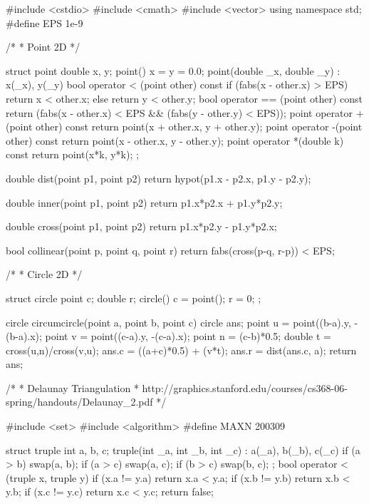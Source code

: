 \documentclass[11pt]{article}
\begin{document}
\begingroup\scriptsize
\begin{vncode}
#include <cstdio>
#include <cmath>
#include <vector>
using namespace std;
#define EPS 1e-9

/*
 * Point 2D
 */

struct point {
	double x, y;
	point() { x = y = 0.0; }
	point(double _x, double _y) : x(_x), y(_y) {}
	bool operator < (point other) const {
		if (fabs(x - other.x) > EPS) return x < other.x;
		else return y < other.y;
	}
	bool operator == (point other) const {
		return (fabs(x - other.x) < EPS && (fabs(y - other.y) < EPS));
	}
	point operator +(point other) const {
		return point(x + other.x, y + other.y);
	}
	point operator -(point other) const {
		return point(x - other.x, y - other.y);
	}
	point operator *(double k) const {
		return point(x*k, y*k);
	}
};

double dist(point p1, point p2) {
	return hypot(p1.x - p2.x, p1.y - p2.y);
}

double inner(point p1, point p2) {
	return p1.x*p2.x + p1.y*p2.y;
}

double cross(point p1, point p2) {
	return p1.x*p2.y - p1.y*p2.x;
}

bool collinear(point p, point q, point r) {
	return fabs(cross(p-q, r-p)) < EPS;
}

/*
 * Circle 2D
 */

struct circle {
	point c;
	double r;
	circle() { c = point(); r = 0; }
};

circle circumcircle(point a, point b, point c) {
	circle ans;
	point u = point((b-a).y, -(b-a).x);
	point v = point((c-a).y, -(c-a).x);
	point n = (c-b)*0.5;
	double t = cross(u,n)/cross(v,u);
	ans.c = ((a+c)*0.5) + (v*t);
	ans.r = dist(ans.c, a);
	return ans;
}

/*
 * Delaunay Triangulation
 * http://graphics.stanford.edu/courses/cs368-06-spring/handouts/Delaunay_2.pdf
 */

#include <set>
#include <algorithm>
#define MAXN 200309

struct truple {
	int a, b, c;
	truple(int _a, int _b, int _c) :
		a(_a), b(_b), c(_c) {
		if (a > b) swap(a, b);
		if (a > c) swap(a, c);
		if (b > c) swap(b, c);
	}
};
bool operator < (truple x, truple y) {
	if (x.a != y.a) return x.a < y.a;
	if (x.b != y.b) return x.b < y.b;
	if (x.c != y.c) return x.c < y.c;
	return false;
}


\end{vncode}
\end{document}

